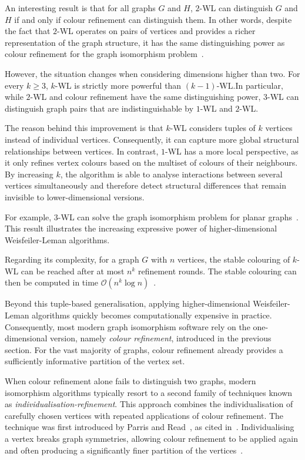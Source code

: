 \newpage

An interesting result is that for all graphs $G$ and $H$, $2$-WL can distinguish $G$ and $H$ if and only if colour refinement can distinguish them. In other words, despite the fact that $2$-WL operates on pairs of vertices and provides a richer representation of the graph structure, it has the same distinguishing power as colour refinement for the graph isomorphism problem~\cite{grohe2012structural}.

However, the situation changes when considering dimensions higher than two. For every $k \geq 3$, $k$-WL is strictly more powerful than $(k-1)$-WL.\@ In particular, while $2$-WL and colour refinement have the same distinguishing power, $3$-WL can distinguish graph pairs that are indistinguishable by $1$-WL and $2$-WL.\@

The reason behind this improvement is that $k$-WL considers tuples of $k$ vertices instead of individual vertices. Consequently, it can capture more global structural relationships between vertices. In contrast, $1$-WL has a more local perspective, as it only refines vertex colours based on the multiset of colours of their neighbours. By increasing $k$, the algorithm is able to analyse interactions between several vertices simultaneously and therefore detect structural differences that remain invisible to lower-dimensional versions.

For example, $3$-WL can solve the graph isomorphism problem for planar graphs~\cite{kiefer2019weisfeiler}. This result illustrates the increasing expressive power of higher-dimensional Weisfeiler-Leman algorithms.

Regarding its complexity, for a graph $G$ with $n$ vertices, the stable colouring of $k$-WL can be reached after at most $n^k$ refinement rounds. The stable colouring can then be computed in time $\mathcal{O}(n^k \log n)$~\cite{grohe2012structural}.


Beyond this tuple-based generalisation, applying higher-dimensional Weisfeiler-Leman algorithms quickly becomes computationally expensive in practice. Consequently, most modern graph isomorphism software rely on the one-dimensional version, namely \emph{colour refinement}, introduced in the previous section. For the vast majority of graphs, colour refinement already provides a sufficiently informative partition of the vertex set.

When colour refinement alone fails to distinguish two graphs, modern isomorphism algorithms typically resort to a second family of techniques known as \emph{individualisation-refinement}. This approach combines the individualisation of carefully chosen vertices with repeated applications of colour refinement. The technique was first introduced by Parris and Read~\cite{parris1969coding}, as cited in~\cite{mckay2014practical}. Individualising a vertex breaks graph symmetries, allowing colour refinement to be applied again and often producing a significantly finer partition of the vertices~\cite{grohe2020graph}.

